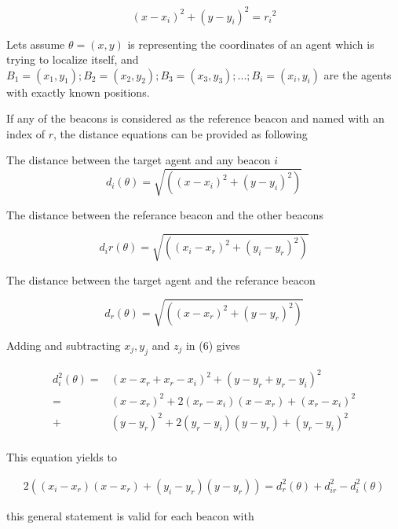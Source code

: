 \documentclass[twoside]{article}
\begin{document}
\begin{equation}
  (x-x_i)^2 + (y - y_i)^2 = {r_i}^2
\end{equation}

Lets assume $\theta = (x,y)$ is representing the coordinates of an agent which is trying to localize itself, and $B_1 = (x_1,y_1) ; B_2 = (x_2,y_2) ; B_3 = (x_3,y_3) ; ...  ; B_i = (x_i,y_i)$ are the agents with exactly known positions. 



If any of the beacons is considered as the reference beacon and named with an index of $r$, the distance equations can be provided as following 

The distance between the target agent and any beacon $i$
\begin{equation}
  d_i(\theta) = \sqrt{\left((x - x_i)^2 + (y - y_i)^2\right)}
\end{equation}

The distance between the referance beacon and the other beacons

\begin{equation}
d_ir(\theta) = \sqrt{\left((x_i - x_r)^2 + (y_i - y_r)^2\right)}
\end{equation}

The distance between the target agent and the referance beacon

\begin{equation}
d_r(\theta) = \sqrt{\left((x - x_r)^2 + (y - y_r)^2\right)}
\end{equation}

Adding and subtracting $x_j, y_j$ and $z_j$ in (6) gives

\begin{align*}
d_i^2(\theta) = & (x - x_r + x_r - x_i)^2 + (y - y_r + y_r - y_i)^2 \\
              = & (x - x_r)^2 + 2(x_r - x_i)(x - x_r) + (x_r-x_i)^2 \\ 
              + & (y - y_r)^2 + 2(y_r - y_i)(y - y_r) + (y_r - y_i)^2 \\               
\end{align*}


This equation yields to

\begin{align*}
 2((x_i - x_r)(x - x_r) + (y_i - y_r)(y - y_r)) = d_r^2(\theta) + d_{ir}^2 - d_i^2(\theta)
\end{align*}

this general statement is valid for each beacon with
\end{document}
